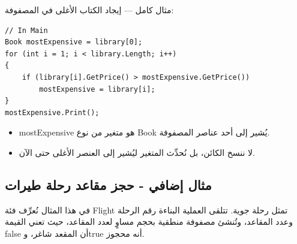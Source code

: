 \documentclass[14pt]{extarticle}
\begin{document}
\clearpage

مثال كامل — إيجاد الكتاب الأغلى في المصفوفة:

\begin{boxExample}
\begin{english}
\begin{verbatim}
// In Main
Book mostExpensive = library[0];
for (int i = 1; i < library.Length; i++)
{
    if (library[i].GetPrice() > mostExpensive.GetPrice())
        mostExpensive = library[i];
}
mostExpensive.Print();
\end{verbatim}
\end{english}
\end{boxExample}

\begin{itemize}[itemsep=1pt]
    \item \textenglish{mostExpensive} هو متغير من نوع \textenglish{Book} يُشير إلى أحد عناصر المصفوفة.
    \item لا ننسخ الكائن، بل نُحدِّث المتغير ليُشير إلى العنصر الأغلى حتى الآن.
\end{itemize}

\clearpage

\subsection{مثال إضافي - حجز مقاعد رحلة طيرات}

في هذا المثال نُعرِّف فئة \textenglish{Flight} تمثل رحلة جوية.
تتلقى العملية البناءة رقم الرحلة وعدد المقاعد، وتُنشئ مصفوفة منطقية بحجم مساوٍ لعدد المقاعد،
حيث تعني القيمة \textenglish{false} أن المقعد شاغر، و\textenglish{true} أنه محجوز.
\end{document}
